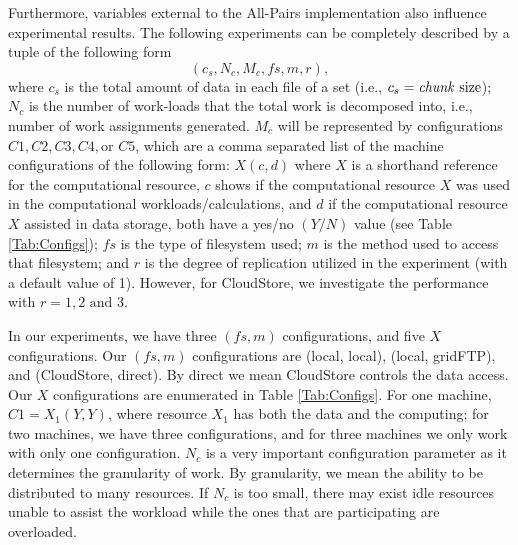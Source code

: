 \documentclass{rspublic}
\begin{document}
Furthermore, variables external to the All-Pairs implementation also
influence experimental results. The following experiments can be
completely described by a tuple of the following form
 \begin{equation}
(c_s, N_c, M_c, f\!s, m,r),
\label{Eq:tuple}
\end{equation}
where $c_s$ is the total amount of data in each file of a set (i.e.,
$c_s=\mbox{\textit{chunk} size}$); $N_c$ is the number of work-loads
that the total work is decomposed into, i.e., number of work assignments
generated. $M_c$ will be
represented by configurations $C1, C2, C3, C4, \mbox{or } C5$, which are
a comma separated list of the machine configurations of the following
form: $X(c, d)$ where $X$ is a shorthand reference for the computational
resource, $c$ shows if the computational resource $X$ was used in the
computational workloads/calculations, and $d$ if the computational
resource $X$ assisted in data storage, both have a yes/no $(Y/N)$ value
(see Table \ref{Tab:Configs}); $f\!s$ is the type of filesystem used;
$m$ is the method used to access that filesystem; and $r$ is the degree
of replication utilized in the experiment (with a default value of 1).
However, for CloudStore, we investigate the performance with $r = 1, 2
\mbox{ and } 3$.

In our experiments, we have three $(f\!s, m)$ configurations, and five
$X$ configurations. Our $(f\!s, m)$ configurations are (local, local),
(local, gridFTP), and (CloudStore, direct). By direct we mean CloudStore
controls the data access. Our $X$ configurations are enumerated in Table
\ref{Tab:Configs}. For one machine, $C1=X_1(Y,Y)$, where resource $X_1$
has both the data and the computing; for two machines, we have three
configurations, and for three machines we only work with only one
configuration. $N_c$ is a very important configuration parameter as it
determines the granularity of work. By granularity, we mean the ability
to be distributed to many resources.  If $N_c$ is too small, there may
exist idle resources unable to assist the workload while the ones that
are participating are overloaded.
\end{document}
